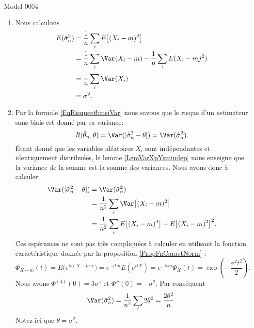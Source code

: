 
\begin{corrige}{Model-0004}

    \begin{enumerate}
        \item
            Nous calculons
            \begin{equation}
                \begin{aligned}[]
                    E(\hat\sigma_n^2)&=\frac{1}{ n }\sum_i E\big[ (X_i-m)^2 \big]\\
                    &=\frac{1}{ n }\sum_i\Var(X_i-m)-\frac{1}{ n }\sum_iE(X_i-mj^2)\\
                    &=\frac{1}{ n }\sum_i\Var(X_i)\\
                    &=\sigma^2.
                \end{aligned}
            \end{equation}
        \item
            Par la formule \eqref{EqRisqueetbaisiVar} nous savons que le risque d'un estimateur sans biais est donné par sa variance:
            \begin{equation}
                R(\hat\theta_n,\theta)=\Var(| \hat\sigma_n^2-\theta |)=\Var(\hat\sigma_n^2).
            \end{equation}
            Étant donné que les variables aléatoires \( X_i\) sont indépendantes et identiquement distribuées, le lemme \ref{LemVarXpYsmindep} nous enseigne que la variance de la somme est la somme des variances. Nous avons donc à calculer
            \begin{equation}
                \begin{aligned}[]
                    \Var(| \hat\sigma_n^2-\theta |)&=\Var(\hat\sigma_n^2)\\
                    &=\frac{1}{ n^2 }\sum_i\Var\big[ (X_i-m)^2 \big]\\
                    &=\frac{1}{ n^2 }\sum_i E\big[ (X_i-m)^4 \big]-E\big[ (X_i-m)^2 \big]^2.
                \end{aligned}
            \end{equation}
            Ces espérances ne sont pas très compliquées à calculer en utilisant la fonction caractéristique donnée par la proposition \ref{PropFnCaractNorm} :
            \begin{equation}
                \Phi_{X-m}(t)= E\big(  e^{it(X-m)} \big)= e^{-itm}E( e^{itX})= e^{-itm}\Phi_X(t)= \exp\left( -\frac{ \sigma^2t^2 }{2} \right).
            \end{equation}
            Nous avons \( \Phi^{(4)}(0)=3\sigma^4\) et \( \Phi''(0)=-\sigma^2\). Par conséquent
            \begin{equation}
                \Var(\hat\sigma_n^2)=\frac{1}{ n^2 }\sum_i2\theta^2=\frac{ 2\theta^2 }{ n }.
            \end{equation}
            Notez ici que \( \theta=\sigma^2\).


\end{enumerate}
\end{corrige}
